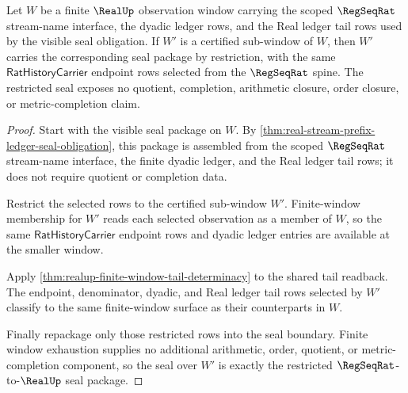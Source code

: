 \begin{theorem}
\label{thm:realup-regseqrat-window-seal-restriction}
Let $W$ be a finite $\RealUp$ observation window carrying the scoped
$\RegSeqRat$ stream-name interface, the dyadic ledger rows, and the Real
ledger tail rows used by the visible seal obligation. If $W'$ is a certified
sub-window of $W$, then $W'$ carries the corresponding seal package by
restriction, with the same $\mathsf{RatHistoryCarrier}$ endpoint rows selected
from the $\RegSeqRat$ spine. The restricted seal exposes no quotient,
completion, arithmetic closure, order closure, or metric-completion claim.
\end{theorem}
\begin{proof}
Start with the visible seal package on $W$. By
\autoref{thm:real-stream-prefix-ledger-seal-obligation}, this package is
assembled from the scoped $\RegSeqRat$ stream-name interface, the finite
dyadic ledger, and the Real ledger tail rows; it does not require quotient or
completion data.

Restrict the selected rows to the certified sub-window $W'$. Finite-window
membership for $W'$ reads each selected observation as a member of $W$, so the
same $\mathsf{RatHistoryCarrier}$ endpoint rows and dyadic ledger entries are
available at the smaller window.

Apply \autoref{thm:realup-finite-window-tail-determinacy} to the shared
tail readback. The endpoint, denominator, dyadic, and Real ledger tail rows
selected by $W'$ classify to the same finite-window surface as their
counterparts in $W$.

Finally repackage only those restricted rows into the seal boundary. Finite
window exhaustion supplies no additional arithmetic, order, quotient, or
metric-completion component, so the seal over $W'$ is exactly the restricted
$\RegSeqRat$-to-$\RealUp$ seal package.
\end{proof}

